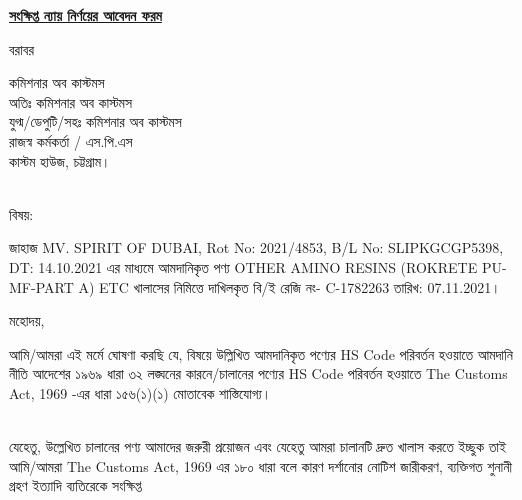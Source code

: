 \documentclass[12pt]{article}
\newcommand{\beno}{C-1782263}
\newcommand{\bedt}{07.11.2021}
\newcommand{\blno}{SLIPKGCGP5398}
\newcommand{\bldt}{14.10.2021}
\newcommand{\good}{OTHER AMINO RESINS (ROKRETE PU-MF-PART A) ETC}
\newcommand{\vessel}{MV. SPIRIT OF DUBAI}
\newcommand{\menifest}{2021/4853}
\begin{document}
\begin{center}
\underline{\textbf{সংক্ষিপ্ত ন্যায় নির্ণয়ের আবেদন ফরম}}
\end{center}
\noindent
বরাবর
\\
\begin{minipage}[t]{0.08\linewidth}
\hspace{1em}
\end{minipage}
\begin{minipage}[t]{0.92\linewidth}
কমিশনার অব কাস্টমস
\\
অতিঃ কমিশনার অব কাস্টমস
\\
যুগ্ম/ডেপুটি/সহঃ কমিশনার অব কাস্টমস
\\
রাজস্ব কর্মকর্তা / এস.পি.এস
\\
কাস্টম হাউজ,
চট্টগ্রাম।
\\
\\
\end{minipage}
\begin{minipage}[t]{0.08\linewidth}
বিষয়:
\end{minipage}
\begin{minipage}[t]{0.92\linewidth}
জাহাজ {\vessel}, Rot No: {\menifest}, B/L No: {\blno}, DT: {\bldt}
এর মাধ্যমে আমদানিকৃত পণ্য {\good} খালাসের নিমিত্তে
দাখিলকৃত বি/ই রেজি নং- {\beno} তারিখ: {\bedt}।
\\
\end{minipage}
\begin{minipage}[t]{0.08\linewidth}
মহোদয়,
\end{minipage}
\begin{minipage}[t]{0.92\linewidth}
\hspace{1em}
\end{minipage}
\begin{minipage}[t]{0.08\linewidth}
\hspace{1em}
\end{minipage}
আমি/আমরা এই মর্মে ঘোষণা
করছি যে, বিষয়ে উল্লিখিত আমদানিকৃত পণ্যের HS Code
পরিবর্তন হওয়াতে আমদানি নীতি আদেশের ১৯৬৯ ধারা
৩২ লঙ্ঘনের কারনে/চালানের পণ্যের HS Code
পরিবর্তন হওয়াতে
The Customs Act, 1969
-এর ধারা
১৫৬(১)(১) মোতাবেক শাস্তিযোগ্য।
\\
\\
\begin{minipage}[t]{0.08\linewidth}
\hspace{1em}
\end{minipage}
যেহেতু, উল্লেখিত চালানের পণ্য আমাদের জরুরী প্রয়োজন
এবং যেহেতু আমরা চালানটি দ্রুত খালাস করতে ইচ্ছুক
তাই আমি/আমরা
The Customs Act, 1969
এর ১৮০ ধারা বলে কারণ দর্শানোর নোটিশ
জারীকরণ, ব্যক্তিগত শুনানী গ্রহণ ইত্যাদি ব্যতিরেকে সংক্ষিপ্ত
\end{document}
